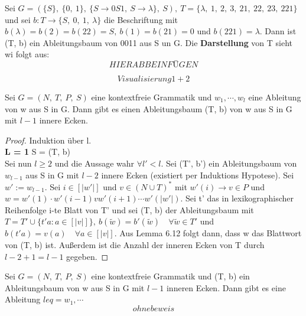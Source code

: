     Sei \(G = (\{S\},\ \{0,\ 1\},\ \{S \to 0S1,\ S \to \lambda\},\ S),\ T = \{\lambda,\ 1,\ 2,\ 3,\ 21,\ 22,\ 23,\ 221\}\) und sei \(b:T\to\{S,\ 0,\ 1,\ \lambda\}\) die Beschriftung mit \(b(\lambda) = b(2) = b(22) = S,\ b(1) = b(21) = 0\) und \(b(221) = \lambda\). Dann ist (T, b) ein Ableitungsbaum von 0011 aus S un G. Die \textbf{Darstellung} von T sieht wi folgt aus: \[HIERABBEINFÜGEN\]

    \[Visualisierung 1 + 2 \]

    Sei \(G = (N,\ T,\ P,\ S)\) eine kontextfreie Grammatik und \(w_1, \cdots, w_l\) eine Ableitung von w aus S in G. Dann gibt es einen Ableitungsbaum (T, b) von w aus S in G mit \(l-1\) innere Ecken. 
    \begin{proof}
        Induktion über l.\\
        \textbf{L = 1} S = (T, b)\\
        Sei nun \(l \geq 2\) und die Aussage wahr \(\forall l' < l\). Sei (T', b') ein Ableitungsbaum von \(w_{l-1}\) aus S in G mit \(l-2\) innere Ecken (existiert per Induktions Hypotese). Sei \(w' := w_{l-1}\). Sei \(i \in [|w'|]\) und \(v \in (N \cup T)^*\) mit \(w'(i) \to v \in P\) und \(w = w'(1) \cdot w'(i-1) v w'(i+1)\cdots w'(|w'|)\). Sei t' das in lexikographischer Reihenfolge i-te Blatt von T' und sei (T, b) der Ableitungsbaum mit \(T = T' \cup \{t'a : a \in [|v|]\},\ b(\tilde{w}) = b'(\tilde{w}) \quad \forall \tilde{w} \in T'\) und \(b(t'a) = v(a) \quad \forall a \in [|v|]\). Aus Lemma 6.12 folgt dann, dass w das Blattwort von (T, b) ist. Außerdem ist die Anzahl der inneren Ecken von T durch \(l - 2 + 1 = l - 1\) gegeben.
    \end{proof}

    Sei \(G = (N,\ T,\ P,\ S)\) eine kontextfreie Grammatik und (T, b) ein Ableitungsbaum von w aus S in G mit \(l - 1\) inneren Ecken. Dann gibt es eine Ableitung \(leq = w_1, \cdots\) 
    \[ohne beweis\]


